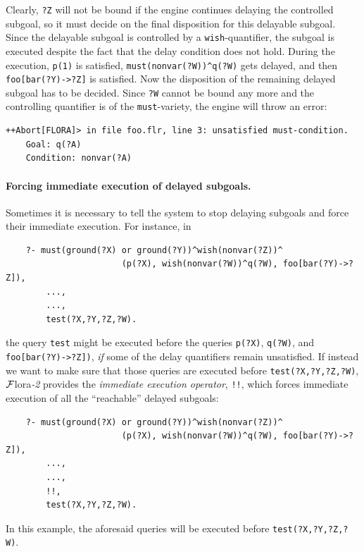 \documentclass[11pt]{article}
\newcommand{\FLORA}{{\mbox{\sc ${\cal F}${lora}\rm\emph{-2}}}\xspace}
\begin{document}
Clearly, \texttt{?Z} will not be bound if the engine continues delaying the
controlled subgoal, so it must decide on the final disposition for this
delayable subgoal. Since the delayable subgoal
is controlled by a \texttt{wish}-quantifier,
the subgoal is executed despite the fact that the delay condition does not
hold. During the execution, \texttt{p(1)} is
satisfied, \texttt{must(nonvar(?W))\^{}q(?W)} gets delayed, and then
\texttt{foo[bar(?Y)->?Z]} is satisfied. 
Now the disposition of the remaining delayed subgoal has to be decided.
Since \texttt{?W} cannot be bound any more and the controlling quantifier
is of the \texttt{must}-variety, the engine will throw an error:
\begin{verbatim}
++Abort[FLORA]> in file foo.flr, line 3: unsatisfied must-condition.
	Goal: q(?A)
	Condition: nonvar(?A)
\end{verbatim}

\index{!!}
\paragraph{Forcing immediate execution of delayed subgoals.}
Sometimes it is necessary to tell the system to stop delaying
subgoals and force their immediate execution.
For instance, in
\begin{verbatim}
    ?- must(ground(?X) or ground(?Y))^wish(nonvar(?Z))^
                       (p(?X), wish(nonvar(?W))^q(?W), foo[bar(?Y)->?Z]),
        ...,
        ...,
        test(?X,?Y,?Z,?W).
\end{verbatim}
the query \texttt{test} might be executed before the queries \texttt{p(?X)},
\texttt{q(?W)}, and \texttt{foo[bar(?Y)->?Z])}, \emph{if} some of the
delay quantifiers remain unsatisfied. If instead we want
to make sure that those queries are executed before
\texttt{test(?X,?Y,?Z,?W)}, \FLORA provides the \emph{immediate execution
operator}, \texttt{!!},
which forces immediate execution of all the ``reachable'' delayed subgoals:
\begin{verbatim}
    ?- must(ground(?X) or ground(?Y))^wish(nonvar(?Z))^
                       (p(?X), wish(nonvar(?W))^q(?W), foo[bar(?Y)->?Z]),
        ...,
        ...,
        !!,
        test(?X,?Y,?Z,?W).
\end{verbatim}
In this example, the aforesaid queries will be executed before
\texttt{test(?X,?Y,?Z,?W)}. 
\end{document}
